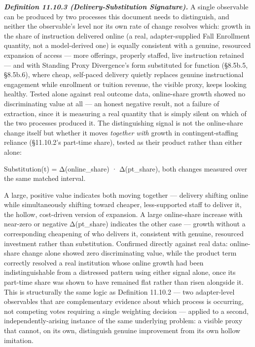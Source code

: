 \documentclass[
]{article}
\begin{document}
\emph{\textbf{Definition 11.10.3 (Delivery-Substitution Signature).}} A
single observable can be produced by two processes this document needs
to distinguish, and neither the observable's level nor its own rate of
change resolves which: growth in the share of instruction delivered
online (a real, adapter-supplied Fall Enrollment quantity, not a
model-derived one) is equally consistent with a genuine, resourced
expansion of access --- more offerings, properly staffed, live
instruction retained --- and with Standing Proxy Divergence's form
substituted for function (§8.5b.5, §8.5b.6), where cheap, self-paced
delivery quietly replaces genuine instructional engagement while
enrollment or tuition revenue, the visible proxy, keeps looking healthy.
Tested alone against real outcome data, online-share growth showed no
discriminating value at all --- an honest negative result, not a failure
of extraction, since it is measuring a real quantity that is simply
silent on which of the two processes produced it. The distinguishing
signal is not the online-share change itself but whether it moves
\emph{together with} growth in contingent-staffing reliance (§11.10.2's
part-time share), tested as their product rather than either alone:

Substitution(t) = Δ(online\_share) · Δ(pt\_share), both changes measured
over the same matched interval.

A large, positive value indicates both moving together --- delivery
shifting online while simultaneously shifting toward cheaper,
less-supported staff to deliver it, the hollow, cost-driven version of
expansion. A large online-share increase with near-zero or negative
Δ(pt\_share) indicates the other case --- growth without a corresponding
cheapening of who delivers it, consistent with genuine, resourced
investment rather than substitution. Confirmed directly against real
data: online-share change alone showed zero discriminating value, while
the product term correctly resolved a real institution whose online
growth had been indistinguishable from a distressed pattern using either
signal alone, once its part-time share was shown to have remained flat
rather than risen alongside it. This is structurally the same logic as
Definition 11.10.2 --- two adapter-level observables that are
complementary evidence about which process is occurring, not competing
votes requiring a single weighting decision --- applied to a second,
independently-arising instance of the same underlying problem: a visible
proxy that cannot, on its own, distinguish genuine improvement from its
own hollow imitation.
\end{document}

